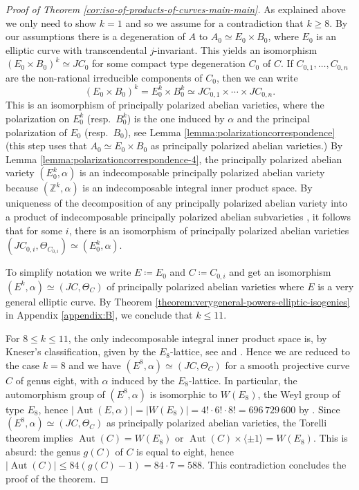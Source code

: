 \documentclass[a4paper,11pt,reqno]{amsart}
\numberwithin{equation}{section}
\theoremstyle{plain}
\theoremstyle{definition}
\newcommand{\Z}{\mathbb Z}
\newcommand{\Aut}{\operatorname{Aut}}
\renewcommand{\cong}{\simeq}
\newcommand{\va}[1]{\left| #1 \right|}
\begin{document}
\begin{proof}[Proof of Theorem \ref{cor:iso-of-products-of-curves-main-main}]
As explained above we only need to show $k=1$ and so we assume for a contradiction that $k\geq 8$.
By our assumptions there is a degeneration of $A$ to $A_0\cong E_0\times B_0$, where $E_0$ is an elliptic curve with transcendental $j$-invariant.
This yields an isomorphism $(E_0\times B_0)^k \cong JC_0$ for some compact type degeneration $C_0$ of $C$. If $C_{0,1}, \dotsc, C_{0,n}$ are the non-rational irreducible components of $C_0$, then we can write 
$$
(E_0\times B_0)^k = E_0^k\times B_0^k \cong JC_{0,1} \times \cdots \times JC_{0,n}. 
$$
This is an isomorphism of principally polarized abelian varieties, where the polarization on $E_0^k$ (resp.\ $B_0^k$) is the one induced by $\alpha$ and the principal polarization of $E_0$ (resp.\ $B_0$), see Lemma \ref{lemma:polarizationcorrespondence}
(this step uses that $A_0\cong E_0\times B_0$ as principally polarized abelian varieties.)  
By Lemma \ref{lemma:polarizationcorrespondence-4}, the principally polarized abelian variety $(E_0^k,\alpha)$ is an indecomposable principally polarized abelian variety because $(\Z^k,\alpha)$ is an indecomposable integral inner product space. 
By uniqueness of the decomposition of any principally polarized abelian variety into a product of indecomposable principally polarized abelian subvarieties \cite{clemensgriffiths-cubicthreefold, debarre-produits}, it follows that for some $i$, there is an isomorphism of principally polarized abelian varieties $(JC_{0,i},\Theta_{C_{0,i}}) \cong (E_0^k, \alpha)$. 

To simplify notation we write $E\coloneqq E_0$ and $C\coloneqq C_{0,i}$ and get an isomorphism $(E^k,\alpha) \cong (JC,\Theta_C)$ of principally polarized abelian varieties where $E$ is a very general elliptic curve. 
By Theorem \ref{theorem:verygeneral-powers-elliptic-isogenies} in Appendix \ref{appendix:B}, we conclude that $k \leq 11$. 

For $8 \leq k \leq 11$, the only indecomposable integral inner product space is, by Kneser's classification, given by the $E_8$-lattice, see \cite[p.\ 28, Remark 1]{milnorhusemoller} and \cite{kneser-quadratisch}. 
 Hence we are reduced to the case $k=8$ and we have $(E^8, \alpha) \cong (JC,\Theta_C)$ for a smooth projective curve $C$ of genus eight, with $\alpha$ induced by the $E_8$-lattice. 
 In particular, the automorphism group of $(E^8, \alpha)$ is isomorphic to $W(E_8)$, the Weyl group of type $E_8$, hence $\va{\Aut(E,\alpha)} = \va{W(E_8)} = 4! \cdot 6! \cdot  8!= 696\,729\,600$ by \cite[Section 2.12]{humphreys-reflectiongroups}. 
 Since $(E^8,\alpha) \cong (JC,\Theta_C)$ as principally polarized abelian varieties, the Torelli theorem implies $\Aut(C) = W(E_8)$ or $\Aut(C) \times \langle \pm{1} \rangle = W(E_8)$. 
 This is absurd: the genus $g(C)$ of $C$ is equal to eight, hence $\va{\Aut(C)} \leq 84(g(C)-1)  = 84 \cdot 7=588$. 
This contradiction concludes the proof of the theorem.
\end{proof}
\end{document}
